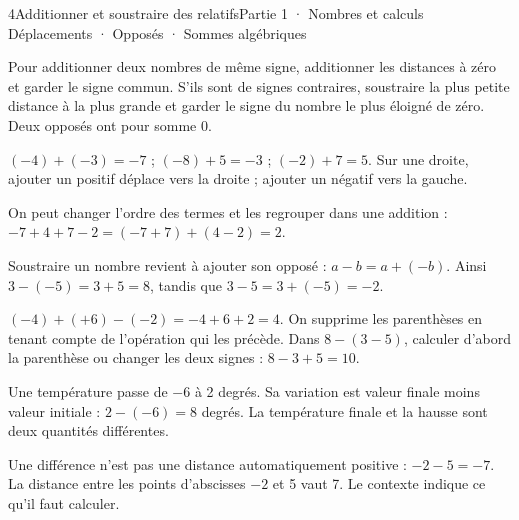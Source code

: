 \begin{ouverture}[calcul]{4}{Additionner et soustraire des relatifs}{Partie 1 · Nombres et calculs}
{Déplacements · Opposés · Sommes algébriques}
\end{ouverture}
\pagestyle{otMain}\essentiel\fontsize{11}{15}\selectfont
{}\label{cours-4-1}
\begin{propriete}Pour additionner deux nombres de même signe, additionner les distances à zéro et garder le signe commun. S’ils sont de signes contraires, soustraire la plus petite distance à la plus grande et garder le signe du nombre le plus éloigné de zéro. Deux opposés ont pour somme 0.\end{propriete}
\label{fig-cours-4-1-cours-addition}

\begin{exemple}$(-4)+(-3)=-7$ ; $(-8)+5=-3$ ; $(-2)+7=5$. Sur une droite, ajouter un positif déplace vers la droite ; ajouter un négatif vers la gauche.\end{exemple}
\begin{savoirfaire}On peut changer l’ordre des termes et les regrouper dans une addition : $-7+4+7-2=(-7+7)+(4-2)=2$.\end{savoirfaire}
\clearpage
{}\label{cours-4-2}
\begin{propriete}Soustraire un nombre revient à ajouter son opposé : $a-b=a+(-b)$. Ainsi $3-(-5)=3+5=8$, tandis que $3-5=3+(-5)=-2$.\end{propriete}
\begin{savoirfaire}$(-4)+(+6)-(-2)=-4+6+2=4$. On supprime les parenthèses en tenant compte de l’opération qui les précède. Dans $8-(3-5)$, calculer d’abord la parenthèse ou changer les deux signes : $8-3+5=10$.\end{savoirfaire}
\begin{exemple}Une température passe de $-6$ à 2 degrés. Sa variation est valeur finale moins valeur initiale : $2-(-6)=8$ degrés. La température finale et la hausse sont deux quantités différentes.\end{exemple}
\begin{attention}Une différence n’est pas une distance automatiquement positive : $-2-5=-7$. La distance entre les points d’abscisses $-2$ et 5 vaut 7. Le contexte indique ce qu’il faut calculer.\end{attention}

